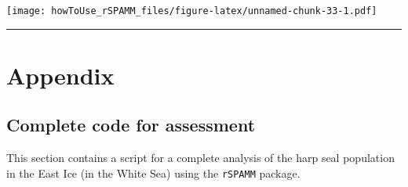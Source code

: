 \documentclass[
]{article}
\begin{document}
\texttt{[image: howToUse\_rSPAMM\_files/figure-latex/unnamed-chunk-33-1.pdf]}

\begin{center}\rule{0.5\linewidth}{0.5pt}\end{center}

\hypertarget{appendix}{%
\section{Appendix}\label{appendix}}

\hypertarget{complete-code-for-assessment}{%
\subsection{Complete code for
assessment}\label{complete-code-for-assessment}}

This section contains a script for a complete analysis of the harp seal
population in the East Ice (in the White Sea) using the \texttt{rSPAMM}
package.
\end{document}
